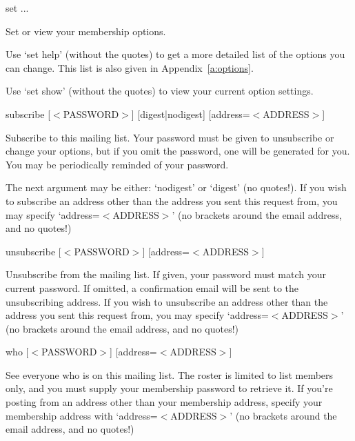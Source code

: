 \documentclass{howto}
\begin{document}
\begin{list}{}{}
    \item set ...
		\begin{list}{}{}
			\item
        Set or view your membership options.

        Use `set help' (without the quotes) to get a more detailed list of the
        options you can change.  This list is also given in 
        Appendix~\ref{a:options}.

        Use `set show' (without the quotes) to view your current option
        settings.
		\end{list}

    \item{subscribe [$<$PASSWORD$>$] [digest|nodigest] [address=$<$ADDRESS$>$]}
		\begin{list}{}{}
			\item
        Subscribe to this mailing list.  Your password must be given to
        unsubscribe or change your options, but if you omit the password, one
        will be generated for you.  You may be periodically reminded of your
        password.

        The next argument may be either: `nodigest' or `digest' (no quotes!).
        If you wish to subscribe an address other than the address you sent
        this request from, you may specify `address=$<$ADDRESS$>$' (no brackets
        around the email address, and no quotes!)
		\end{list}

    \item {unsubscribe [$<$PASSWORD$>$] [address=$<$ADDRESS$>$]}
		\begin{list}{}{}
			\item
        Unsubscribe from the mailing list.  If given, your password must match
        your current password.  If omitted, a confirmation email will be sent
        to the unsubscribing address. If you wish to unsubscribe an address
        other than the address you sent this request from, you may specify
        `address=$<$ADDRESS$>$' (no brackets around the email address, and no
        quotes!)
		\end{list}

    \item {who [$<$PASSWORD$>$] [address=$<$ADDRESS$>$]}
		\begin{list}{}{}
			\item
        See everyone who is on this mailing list.  The roster is limited to
        list members only, and you must supply your membership password to
        retrieve it.  If you're posting from an address other than your
        membership address, specify your membership address with
        `address=$<$ADDRESS$>$' (no brackets around the email address, and no
        quotes!)
		\end{list}
\end{list}
\end{document}
